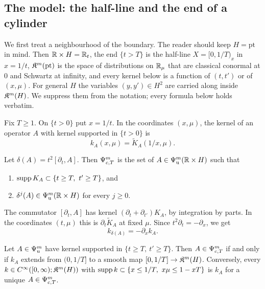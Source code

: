 \subsection{The model: the half-line and the end of a cylinder}
\label{cc:subsec:model}
We first treat a neighbourhood of the boundary. The reader should keep
\(H=\mathrm{pt}\) in mind. Then \(\mathbb R\times H=\mathbb R_t\), the end \(\{t>T\}\)
is the half-line \(X=[0,1/T)_x\) in \(x=1/t\), \(\mathfrak K^m(\mathrm{pt})\) is
the space of distributions on \(\mathbb R_\mu\) that are classical conormal at
\(0\) and Schwartz at infinity, and every kernel below is a function of
\((t,t')\) or of \((x,\mu)\). For general \(H\) the variables
\((y,y')\in H^2\) are carried along inside \(\mathfrak K^m(H)\). We suppress them
from the notation; every formula below holds verbatim.

Fix \(T\ge1\). On \(\{t>0\}\) put \(x=1/t\). In the coordinates
\((x,\mu)\), the kernel of an operator \(A\) with kernel supported in
\(\{t>0\}\) is
\[
 k_A(x,\mu)=\widetilde K_A(1/x,\mu) .
\]

\begin{definition}\label{cc:def:model}
Let \(\delta(A)=t^2[\partial_t,A]\). Then \(\Psi_{c,T}^m\) is the set of
\(A\in\Psi_{\mathrm u}^m(\mathbb R\times H)\) such that
\begin{enumerate}
\item \(\operatorname{supp} K_A\subset\{t\ge T,\ t'\ge T\}\), and
\item \(\delta^j(A)\in\Psi_{\mathrm u}^m(\mathbb R\times H)\) for every \(j\ge0\).
\end{enumerate}
\end{definition}

The commutator \([\partial_t,A]\) has kernel
\((\partial_t+\partial_{t'})K_A\), by integration by parts. In the
coordinates \((t,\mu)\) this is \(\partial_t\widetilde K_A\) at fixed
\(\mu\). Since \(t^2\partial_t=-\partial_x\), we get
\begin{equation}\label{cc:eq:delta}
 k_{\delta(A)}=-\partial_xk_A .
\end{equation}

\begin{lemma}[Characterization]\label{cc:lem:char}
Let \(A\in\Psi_{\mathrm u}^m\) have kernel supported in \(\{t\ge T,\ t'\ge T\}\). Then
\(A\in\Psi_{c,T}^m\) if and only if \(k_A\) extends from \((0,1/T]\) to a
smooth map \([0,1/T]\to\mathfrak K^m(H)\). Conversely, every
\(k\in C^\infty([0,\infty);\mathfrak K^m(H))\) with \(\operatorname{supp} k\subset\{x\le1/T,\
x\mu\le1-xT\}\) is \(k_A\) for a unique \(A\in\Psi_{c,T}^m\).
\end{lemma}

